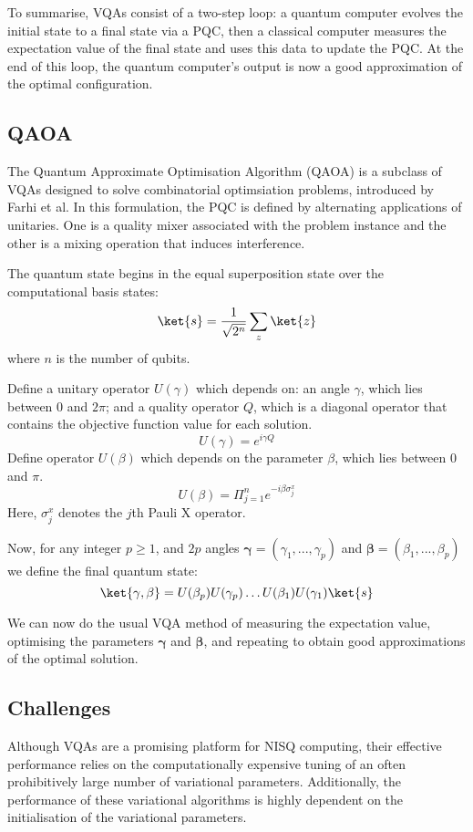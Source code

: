 To summarise, VQAs consist of a two-step loop: a quantum computer evolves the initial state to a final state via a PQC, then a classical computer measures the expectation value of the final state and uses this data to update the PQC. At the end of this loop, the quantum computer's output is now a good approximation of the optimal configuration.

\subsection{QAOA}
The Quantum Approximate Optimisation Algorithm (QAOA) is a subclass of VQAs designed to solve combinatorial optimsiation problems, introduced by Farhi et al. \cite{QAOA} In this formulation, the PQC is defined by alternating applications of unitaries. One is a quality mixer associated with the problem instance and the other is a mixing operation that induces interference.

The quantum state begins in the equal superposition state over the computational basis states:
$$\ket{s}=\frac{1}{\sqrt{2^n}}\sum_{z}\ket{z}$$
where $n$ is the number of qubits.

Define a unitary operator $U(\gamma)$ which depends on: an angle $\gamma$, which lies between 0 and $2\pi$; and a quality operator $Q$, which is a diagonal operator that contains the objective function value for each solution.
$$U(\gamma)=e^{i\gamma Q}$$
Define operator $U(\beta)$ which depends on the parameter $\beta$, which lies between 0 and $\pi$.
$$U(\beta)=\Pi_{j=1}^{n} e^{-i\beta \sigma_j^x}$$
Here, $\sigma_j^x$ denotes the $j$th Pauli X operator.

Now, for any integer $p\geq1$, and $2p$ angles $\mathbf{\gamma}=(\gamma_1, ...,\gamma_p)$ and $\mathbf{\beta}=(\beta_1, ...,\beta_p)$ we define the final quantum state:
$$\ket{\mathbf{\gamma},\mathbf{\beta}}=U(\beta_p)U(\gamma_p)\dots U(\beta_1)U(\gamma_1) \ket{s}$$

We can now do the usual VQA method of measuring the expectation value, optimising the parameters $\mathbf{\gamma}$ and $\mathbf{\beta}$, and repeating to obtain good approximations of the optimal solution.



\subsection{Challenges}
Although VQAs are a promising platform for NISQ computing, their effective performance relies on the computationally expensive tuning of an often prohibitively large number of variational parameters. Additionally, the performance of these variational algorithms is highly dependent on the initialisation of the variational parameters. 


